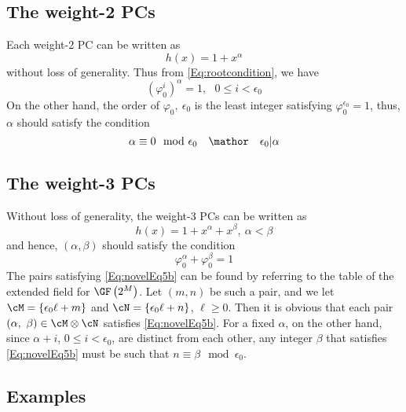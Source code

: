 \subsection{The weight-2 PCs}
\label{sec:PC2}
Each weight-2 PC can be written as 
\begin{equation}
h(x)=1+x^{\alpha}
\label{eq:wt2-gen-form}
\end{equation}
without loss of generality. Thus from \eqref{Eq:rootcondition}, we have 
\begin{equation}
(\varphi_0^i)^{\alpha} =1,~~~ 0 \leq i < \epsilon_0
\label{novelEq5b}
\end{equation}
On the other hand, the order of $\varphi_0,~\epsilon_0$ is the least integer satisfying $\varphi_0^{\epsilon_0} = 1$, thus, $\alpha$ should satisfy the condition
\begin{equation}
\alpha \equiv 0 \mod \epsilon_0~~~\mathor~~~\epsilon_0|\alpha
\label{eq:wt2-alpha}
\end{equation}

\subsection{The weight-3 PCs}

Without loss of generality, the weight-3 PCs can be written as 
\begin{equation}
h(x)=1+x^{\alpha}+x^{\beta},~\alpha < \beta
\label{novelEqwt3}
\end{equation}
and hence, $(\alpha,\beta)$ should satisfy the condition
\begin{equation}
\varphi_0^{\alpha}+\varphi_0^{\beta}= 1
\label{Eq:novelEq5b}
\end{equation}
The pairs satisfying \eqref{Eq:novelEq5b} can be found by referring to the table of the extended field for $\GF\left(2^M\right)$. 
Let $(m,n)$ be such a pair, and we let $\cM=\{\epsilon_0 \ell+m\}$ and $\cN=\{\epsilon_0 \ell+n\}$, $\ell \geq 0$. Then it is obvious that each pair $(\alpha,~\beta) \in \cM \otimes \cN$ satisfies
\eqref{Eq:novelEq5b}. For a fixed $\alpha$, on the other hand, since $\alpha+i$, $0 \leq i < \epsilon_0$, are distinct from each other, any integer $\beta$ that satisfies \eqref{Eq:novelEq5b} must be such that $n\equiv \beta \mod \epsilon_0$.

\subsection{Examples}

